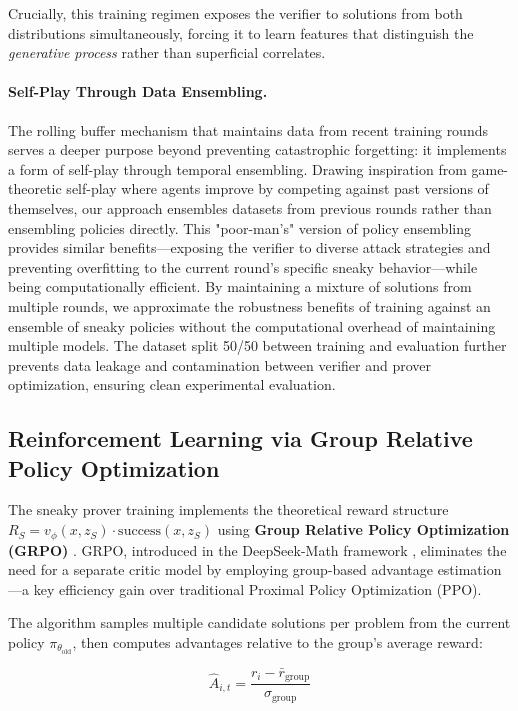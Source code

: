 Crucially, this training regimen exposes the verifier to solutions from both distributions simultaneously, forcing it to learn features that distinguish the \emph{generative process} rather than superficial correlates.

\paragraph{Self-Play Through Data Ensembling.} The rolling buffer mechanism that maintains data from recent training rounds serves a deeper purpose beyond preventing catastrophic forgetting: it implements a form of self-play through temporal ensembling. Drawing inspiration from game-theoretic self-play where agents improve by competing against past versions of themselves, our approach ensembles datasets from previous rounds rather than ensembling policies directly. This "poor-man's" version of policy ensembling provides similar benefits—exposing the verifier to diverse attack strategies and preventing overfitting to the current round's specific sneaky behavior—while being computationally efficient. By maintaining a mixture of solutions from multiple rounds, we approximate the robustness benefits of training against an ensemble of sneaky policies without the computational overhead of maintaining multiple models. The dataset split 50/50 between training and evaluation further prevents data leakage and contamination between verifier and prover optimization, ensuring clean experimental evaluation.

\subsection{Reinforcement Learning via Group Relative Policy Optimization}

The sneaky prover training implements the theoretical reward structure $R_S = v_\phi(x, z_S) \cdot \text{success}(x, z_S)$ using \textbf{Group Relative Policy Optimization (GRPO)} \citep{shao2024deepseek}. GRPO, introduced in the DeepSeek-Math framework \citep{shao2024deepseek}, eliminates the need for a separate critic model by employing group-based advantage estimation—a key efficiency gain over traditional Proximal Policy Optimization (PPO).

The algorithm samples multiple candidate solutions per problem from the current policy $\pi_{\theta_{\text{old}}}$, then computes advantages relative to the group's average reward:

$$\hat{A}_{i,t} = \frac{r_i - \bar{r}_{\text{group}}}{\sigma_{\text{group}}}$$

